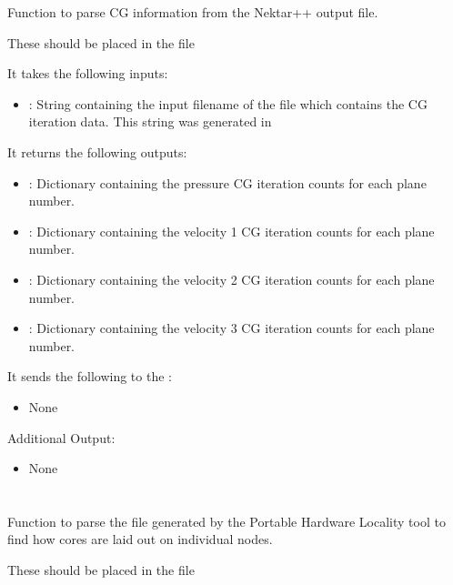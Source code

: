 Function to parse CG information from the Nektar++ output file.

These should be placed in the file 

It takes the following inputs:

\begin{itemize}
\item {}: String containing the input filename of the  file which contains the CG iteration data. This string was generated in 
\end{itemize}

It returns the following outputs:

\begin{itemize}
\item {}: Dictionary containing the pressure CG iteration counts for each plane number.
\item {}: Dictionary containing the velocity 1 CG iteration counts for each plane number.
\item {}: Dictionary containing the velocity 2 CG iteration counts for each plane number.
\item {}: Dictionary containing the velocity 3 CG iteration counts for each plane number.
\end{itemize}

It sends the following to the :

\begin{itemize}
\item None
\end{itemize}

Additional Output:
\begin{itemize}
\item None
\end{itemize}


\section{}

Function to parse the  file generated by the Portable Hardware Locality tool to find how cores are laid out on individual nodes.

These should be placed in the file 

